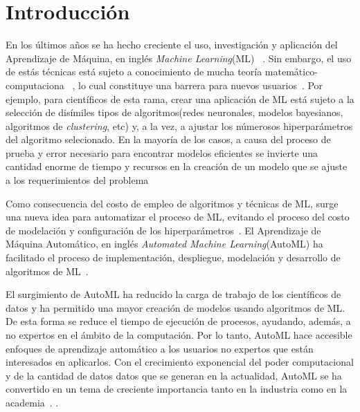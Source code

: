 \chapter*{Introducción}\label{chapter:introduction}

En los últimos años se ha hecho creciente el uso, investigación y aplicación
del Aprendizaje de Máquina, en inglés \emph{Machine Learning}(ML)
~. Sin embargo, el uso de estás técnicas está
sujeto a conocimiento de mucha teoría matemático-computaciona
~, lo cual constituye una barrera para nuevos
usuarios~. Por ejemplo, para científicos de esta
rama, crear una aplicación de ML está sujeto a la selección de disímiles tipos
de algoritmos(redes neuronales, modelos bayesianos, algoritmos de
\emph{clustering}, etc) y, a la vez, a ajustar los númerosos hiperparámetros
del algoritmo selecionado. En la mayoría de los casos, a causa del proceso de
prueba y error necesario para encontrar modelos eficientes se invierte una
cantidad enorme de tiempo y recursos en la creación de un modelo que se ajuste
a los requerimientos del problema

Como consecuencia del costo de empleo de algoritmos y técnicas de ML, surge una
nueva idea para automatizar el proceso de ML, evitando el proceso del costo de
modelación y configuración de los hiperparámetros~.
El Aprendizaje de Máquina Automático, en inglés \emph{Automated Machine
Learning}(AutoML) ha facilitado el proceso de implementación, despliegue,
modelación y desarrollo de algoritmos de ML~.

El surgimiento de AutoML ha reducido la carga de trabajo de los científicos de
datos y ha permitido una mayor creación de modelos usando algoritmos de ML. De
esta forma se reduce el tiempo de ejecución de procesos, ayudando, además, a no
expertos en el ámbito de la computación. Por lo tanto, AutoML hace accesible
enfoques de aprendizaje automático a los usuarios no expertos que están
interesados en aplicarlos. Con el crecimiento exponencial del poder
computacional y de la cantidad de datos datos que se generan en la actualidad,
AutoML se ha convertido en un tema de creciente importancia tanto en la
industria como en la academia~. . 

